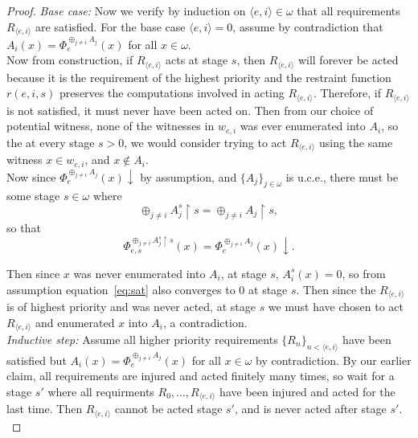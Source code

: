 \documentclass{article}
\begin{document}
\begin{enumerate}[label={(\roman*)}]
\begin{proof}
        \textit{Base case:} Now we verify by induction on $\langle
        e,i\rangle\in\omega$ that all requirements $R_{\langle e,i\rangle}$
        are satisfied. For the base case $\langle e,i\rangle=0$, assume by
        contradiction that $A_i(x)=\Phi_e^{\oplus_{j\neq i} A_j}(x)$ for
        all $x\in\omega$. \\

        Now from construction, if $R_{\langle e,i\rangle}$ acts at stage
        $s$, then $R_{\langle e,i\rangle}$ will forever be acted
        because it is the requirement of the highest priority and the
        restraint function $r(e,i,s)$ preserves the computations involved
        in acting $R_{\langle e,i\rangle}$. Therefore, if $R_{\langle
        e,i\rangle}$ is not satisfied, it must never have been acted on.
        Then from our choice of potential witness, none of the witnesses in
        $w_{e,i}$ was ever enumerated into $A_i$, so the at every stage
        $s>0$, we would consider trying to act $R_{\langle e,i\rangle}$
        using the same witness $x\in w_{e,i}$, and $x\not\in A_i$. \\

        Now since $\Phi_e^{\oplus_{j\neq i} A_j}(x)\downarrow$ by
        assumption, and $\{A_j\}_{j\in\omega}$ is u.c.e., there must be
        some stage $s\in\omega$ where
        \[\oplus_{j\neq i} A_j^s \restriction s =\oplus_{j\neq i} A_j
        \restriction s,\]
        so that
        \begin{equation}
          \Phi_{e,s}^{\oplus_{j\neq i} A_j^s \restriction s}(x)
          =\Phi_e^{\oplus_{j\neq i} A_j}(x) \downarrow.
          \label{eq:sat}
        \end{equation}

        Then since $x$ was never enumerated into $A_i$, at stage $s$,
        $A_i^s(x)=0$, so from assumption equation~\eqref{eq:sat} also
        converges to 0 at stage $s$. Then since the $R_{\langle
        e,i\rangle}$ is of highest priority and was never acted, at
        stage $s$ we must have chosen to act $R_{\langle
        e,i\rangle}$ and enumerated $x$ into $A_i$, a contradiction. \\

        \textit{Inductive step:} Assume all higher priority requirements
        $\{R_n\}_{n <\langle e,i\rangle}$ have been satisfied but
        $A_i(x)=\Phi_e^{\oplus_{j\neq i} A_j}(x)$ for all $x\in\omega$ by
        contradiction. By our earlier claim, all requirements are injured
        and acted finitely many times, so wait for a stage
        $s'$ where all requirments $R_0,\ldots,R_{\langle e,i\rangle}$ have
        been injured and acted for the last time. Then $R_{\langle
        e,i\rangle}$ cannot be acted stage $s'$, and is never
        acted after stage $s'$. \\


\end{proof}
\end{enumerate}
\end{document}
